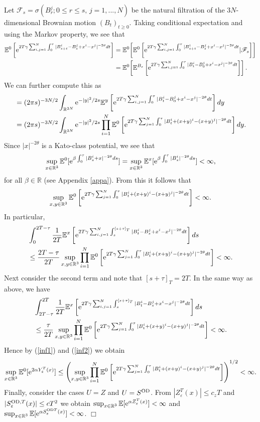 \documentclass[11pt]{article}
\newcommand{\Ebb}{{\mathbb E}}
\providecommand{\eq}[1]{\begin{equation}\label{#1}}
\providecommand{\en}{\end{equation}}
\renewcommand{\d}{\displaystyle}
\providecommand{\qed}{\hfill {$\Box$}\par\medskip}
\providecommand{\BR}{{\mathbb{R}^3 }}
\providecommand{\iijj}{\sum_{i,j=1}^N}
\providecommand{\od}{{\rm OD}}
\providecommand{\RR}{\mathbb{R}}
\providecommand{\kak}[1]{(\ref{#1})}
\providecommand{\fff}{\mathscr{F}}
\providecommand{\lk}{\left(}
\providecommand{\rk}{\right)}
\providecommand{\han}{{1/2}}
\providecommand{\s}{\sigma}
\providecommand{\non}{\nonumber}
\providecommand{\e}{{\rm e}}
\providecommand{\1}{\mathbb{1}}
\providecommand {\s}  {\ensuremath {\mathcal{S}}}
\providecommand{\eps}{\varepsilon}
\begin{document}
Let $\fff_s=\s(B_r^j;0\leq r\leq s, \, j=1,...,N)$ be the natural filtration of the $3N$-dimensional Brownian
motion $(B_t)_{t\geq0}$. Taking conditional expectation and using the Markov property, we see that
\begin{align*}
\Ebb^0 \left[\e^{2 T\gamma \iijj \int_0^{\tau} |B_{s+t}^i-B_s^j+x^i-x^j|^{-2\theta} dt }\right]
&=
\Ebb^0\!\left[
\Ebb^0 \left[\e^{2 T\gamma \iijj \int_0^{\tau} |B_{s+t}^i-B_s^j+x^i-x^j|^{-2\theta} dt }|\fff_s\right]\right]\\
&=
\Ebb^0\!\left[\Ebb^{B_s} \left[\e^{2 T\gamma \iijj \int_0^{\tau}
|B_{t}^i-B_0^j+x^i-x^j|^{-2\theta} dt }\right]\right].
\end{align*}
We can further compute this as
\begin{align*}
&=
(2\pi s)^{-3N/2}\int_{\RR^{3N}} \e^{-|y|^2/2s}
\Ebb^{y} \left[\e^{2 T\gamma \iijj \int_0^{\tau} |B_{t}^i-B_0^j+x^i-x^j|^{-2\theta} dt }\right] dy \\
&=
(2\pi s)^{-3N/2}\int_{\RR^{3N}} \e^{-|y|^2/2s} \prod_{i=1}^N \Ebb^{0} \left[\e^{2 T\gamma
\sum_{j=1}^N \int_0^{\tau} |B_{t}^i+(x+y)^i-(x+y)^j|^{-2\theta} dt }\right] dy.
\end{align*}
Since $|x|^{-2\theta}$ is a Kato-class potential, we see that
$$
\d \sup_{x\in\BR}\Ebb^0[\e^{\beta \int_0^\tau |B^i_s+x|^{-2\theta}ds}]=
\sup_{x\in\BR}\Ebb^x[\e^{\beta \int_0^\tau |B^i_s|^{-2\theta}ds}]<\infty,
$$
for all $\beta\in\RR$ (see Appendix \ref{appa}). From this it follows that
\eq{suppp}
\sup_{x,y\in\BR} \Ebb^0 \left[\e^{2 T\gamma \sum_{j=1}^N \int_0^{\tau}
|B_{t}^i+(x+y)^i-(x+y)^j|^{-2\theta} dt }\right]<\infty.
\en
In particular,
\begin{align}
&
\int_{0}^{2T-\tau} \frac{1}{2T}\Ebb^x \left[\e^{2 T\gamma \iijj \int_s^{[s+\tau]_T}
|B_t^i-B_s^j+x^i-x^j|^{-2\theta} dt }\right]ds \non\\
&\label{inf1}
\leq
\frac{2T-\tau}{2T}\sup_{x,y\in\BR}\prod_{i=1}^N \Ebb^{0}\left[\e^{2 T\gamma \sum_{j=1}^N \int_0^{\tau}
|B_{t}^i+(x+y)^i-(x+y)^j|^{-2\theta} dt }\right]<\infty.
\end{align}
Next consider the second term and note that $[s+\tau]_T=2T$. In the same way as above, we have
\begin{align}
&
\int_{2T-\tau}^{2T} \frac{1}{2T}\Ebb^x \left[\e^{2 T\gamma \iijj \int_s^{[s+\tau]_T}
|B_t^i-B_s^j+x^i-x^j|^{-2\theta} dt }\right]ds \non\\
&\label{inf2}
\leq
\frac{\tau}{2T}\sup_{x,y\in\BR}  \prod_{i=1}^N \Ebb^{0} \left[\e^{2 T\gamma \sum_{j=1}^N \int_0^{\tau}
|B_{t}^i+(x+y)^i-(x+y)^j|^{-2\theta} dt }\right]<\infty.
\end{align}
Hence by \kak{inf1} and \kak{inf2} we obtain
\eq{sup3}
\sup_{x\in\BR}\Ebb^0[\e^{2\alpha Y_\eps^T(x)}] \leq
\lk \sup_{x,y\in\BR}  \prod_{i=1}^N \Ebb^{0} \left[\e^{2 T\gamma \sum_{j=1}^N \int_0^{\tau}
|B_{t}^i+(x+y)^i-(x+y)^j|^{-2\theta} dt }\right]\rk^\han <\infty.
\en
Finally, consider the cases $U=Z$ and $U=S^{\od}$. From  $|Z_\eps^T(x)|\leq c_z T$ and
$|S_\eps^{\od, T}(x)| \leq c T^2$ we obtain $\sup_{x\in\BR}\Ebb[\e^{\alpha Z_\eps^T(x)}]<\infty$
and $\sup_{x\in\BR}\Ebb[\e^{\alpha S_\eps^{\od T}(x)}] <\infty$.
\qed
\end{document}

